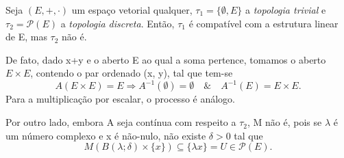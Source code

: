 \documentclass[../distribution_theory_notes.tex]{subfiles}
\begin{document}
\begin{example}
	Seja \((E, +, \cdot )\) um espaço vetorial qualquer, \(\tau_{1}=\{\emptyset , E\}\) a \textit{topologia trivial} e \(\tau_{2}=\mathcal{P}(E)\) a \textit{topologia discreta}. Então, \(\tau_{1}\) é compatível com a estrutura linear de E,
	mas \(\tau_{2}\) não é.

	De fato, dado x+y e o aberto E ao qual a soma pertence, tomamos o aberto \(E\times E\), contendo o par ordenado (x, y), tal que tem-se
	\[
		A(E\times E)=E \Rightarrow A^{-1}(\emptyset )=\emptyset \quad\&\quad A^{-1}(E)=E\times E.
	\]
	Para a multiplicação por escalar, o processo é análogo.

	Por outro lado, embora A seja contínua com respeito a \(\tau_{2}\), M não é, pois se \(\lambda \) é um número complexo e x é não-nulo, não existe \(\delta >0\) tal que
	\[
		M(B(\lambda; \delta )\times \{x\})\subseteq \{\lambda x\}=U\in \mathcal{P}(E).
	\]
\end{example}
\end{document}
